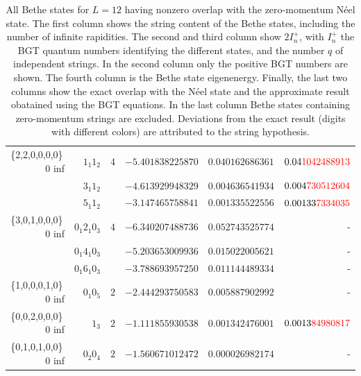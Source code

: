 \documentclass[11pt]{iopart}
\begin{document}
\begin{table}[h]
\begin{tabular}{rrrrrr}
\midrule
\{2,2,0,0,0,0\}\, 0 inf &$1_1 1_2$ & $4$ & $-5.401838225870$ & $0.040162686361$ & $0.04{\color{red}1042488913}$\\  
&$3_1 1_2 $ & & $-4.613929948329$ & $0.004636541934$ & $0.004{\color{red}730512604}$\\
  &$5_1 1_2 $ &  & $-3.147465758841$ & $0.001335522556$ & $0.00133{\color{red}7334035}$\\
\midrule
\{3,0,1,0,0,0\}\, 0 inf &$0_1 2_1 0_3$ & $4$ & $-6.340207488736$ & $0.052743525774$ & -\\
  &$0_1 4_1 0_3$ & & $-5.203653009936$ & $0.015022005621$ & - \\
  &$0_1 6_1 0_3$ & & $-3.788693957250$ & $0.011144489334$ & - \\
\midrule
\{1,0,0,0,1,0\}\, 0 inf &$0_1 0_5$ & $2$ & $-2.444293750583$ & $0.005887902992$ & - \\
\midrule
\{0,0,2,0,0,0\}\, 0 inf &$1_3$ & $2$ & $-1.111855930538$ & $0.001342476001$ & $0.0013{\color{red}84980817}$ \\
\midrule
\{0,1,0,1,0,0\}\, 0 inf &$0_2 0_4$ & $2$ &  $-1.560671012472$ & $0.000026982174$ & - \\
\bottomrule
\end{tabular}
\caption{All Bethe states for $L=12$ having nonzero overlap with the zero-momentum N\'eel state. 
 The first column shows the string content of the Bethe states, including the number of infinite 
 rapidities. The second and third column show $2I_n^+$, with $I_n^+$ the BGT quantum numbers 
 identifying the different states, and the number $q$ of independent strings. In the second 
 column only the positive BGT numbers are shown. The fourth column is the Bethe state eigenenergy. 
 Finally, the last two columns show the exact overlap with the N\'eel state and the approximate 
 result obatained using the BGT equations. In the last column Bethe states containing zero-momentum 
 strings are excluded. Deviations from the exact result (digits with different colors) are 
 attributed to the string hypothesis. 
}
\label{table:neel}
\end{table}
\end{document}
